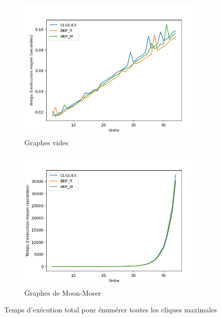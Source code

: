 \documentclass[12pt,a4paper]{article}
\begin{document}
\begin{figure}[ht]
  \centering
  \begin{subfigure}[b]{0.42\textwidth}
    \includegraphics[width=\textwidth]{images/total_pivot_empty_plot.png}
    \caption{Graphes vides}
    \label{subfig:total_empty}
  \end{subfigure}
  \begin{subfigure}[b]{0.42\textwidth}
    \includegraphics[width=\textwidth]{images/total_pivot_turan_plot.png}
    \caption{Graphes de Moon-Moser}
    \label{subfig:total_turan}
  \end{subfigure}
  \caption{Temps d'exécution total pour énumérer toutes les cliques maximales}
  \label{fig:special_total}
\end{figure}
\end{document}
